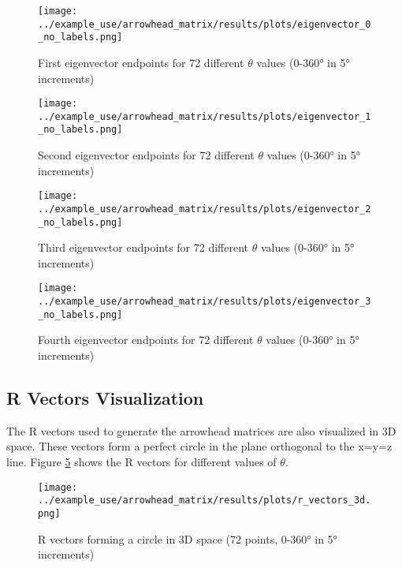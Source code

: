 \begin{figure}[H]
    \centering
    \texttt{[image: ../example\_use/arrowhead\_matrix/results/plots/eigenvector\_0\_no\_labels.png]}
    \caption{First eigenvector endpoints for 72 different $\theta$ values (0-360° in 5° increments)}
    \label{fig:eigenvector_0_no_labels}
\end{figure}

\begin{figure}[H]
    \centering
    \texttt{[image: ../example\_use/arrowhead\_matrix/results/plots/eigenvector\_1\_no\_labels.png]}
    \caption{Second eigenvector endpoints for 72 different $\theta$ values (0-360° in 5° increments)}
    \label{fig:eigenvector_1_no_labels}
\end{figure}

\begin{figure}[H]
    \centering
    \texttt{[image: ../example\_use/arrowhead\_matrix/results/plots/eigenvector\_2\_no\_labels.png]}
    \caption{Third eigenvector endpoints for 72 different $\theta$ values (0-360° in 5° increments)}
    \label{fig:eigenvector_2_no_labels}
\end{figure}

\begin{figure}[H]
    \centering
    \texttt{[image: ../example\_use/arrowhead\_matrix/results/plots/eigenvector\_3\_no\_labels.png]}
    \caption{Fourth eigenvector endpoints for 72 different $\theta$ values (0-360° in 5° increments)}
    \label{fig:eigenvector_3_no_labels}
\end{figure}

\subsection{R Vectors Visualization}

The R vectors used to generate the arrowhead matrices are also visualized in 3D space. These vectors form a perfect circle in the plane orthogonal to the x=y=z line. Figure \ref{fig:r_vectors_3d} shows the R vectors for different values of $\theta$.

\begin{figure}[H]
    \centering
    \texttt{[image: ../example\_use/arrowhead\_matrix/results/plots/r\_vectors\_3d.png]}
    \caption{R vectors forming a circle in 3D space (72 points, 0-360° in 5° increments)}
    \label{fig:r_vectors_3d}
\end{figure}

